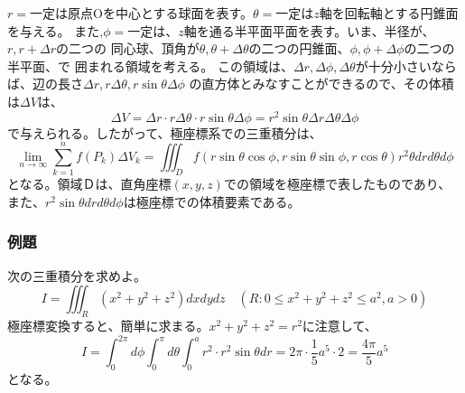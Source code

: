\documentclass[a4j,dvipdfmx]{jsarticle}
\begin{document}
$r=$一定は原点Oを中心とする球面を表す。$\theta =$一定は$z$軸を回転軸とする円錐面を与える。
また,$\phi =$一定は、$z$軸を通る半平面平面を表す。いま、半径が、$r,r+\Delta r$の二つの
同心球、頂角が$\theta ,\theta+\Delta \theta$の二つの円錐面、$\phi,\phi+\Delta\phi$の二つの半平面、で
囲まれる領域を考える。
この領域は、$\Delta r,\Delta \phi,\Delta\theta$が十分小さいならば、辺の長さ$\Delta r,r\Delta\theta,r\sin\theta\Delta \phi$
の直方体とみなすことができるので、その体積は$\Delta V$は、
\begin{equation}
    \Delta V=\Delta r\cdot r\Delta\theta\cdot r\sin\theta\Delta\phi=r^2\sin\theta\Delta r\Delta\theta\Delta\phi\label{6.26}
\end{equation}
で与えられる。したがって、極座標系での三重積分は、
\begin{equation}
    \lim_{n\to\infty}\sum_{k=1}^{n}f(P_k)\Delta V_k=\iiint_D f(r\sin\theta\cos\phi,r\sin\theta\sin\phi,r\cos\theta)r^2\theta drd\theta d\phi\label{6.27}
\end{equation}
となる。領域Ｄは、直角座標$(x,y,z)$での領域を極座標で表したものであり、また、$r^2\sin\theta drd\theta d\phi$は極座標での体積要素である。
\subsubsection*{例題}
次の三重積分を求めよ。
\begin{equation*}
    I=\iiint_R(x^2+y^2+z^2)dxdydz\quad(R:0\leq x^2+y^2+z^2\leq a^2,a>0)
\end{equation*}
極座標変換すると、簡単に求まる。$x^2+y^2+z^2=r^2$に注意して、
\begin{equation*}
    I=\int_0^{2\pi}d\phi\int_0^\pi d\theta\int_0^a r^2\cdot r^2\sin\theta dr
    =2\pi\cdot\frac{1}{5}a^5\cdot 2=\frac{4\pi}{5}a^5
\end{equation*}
となる。
\subsubsection*{}
\end{document}
